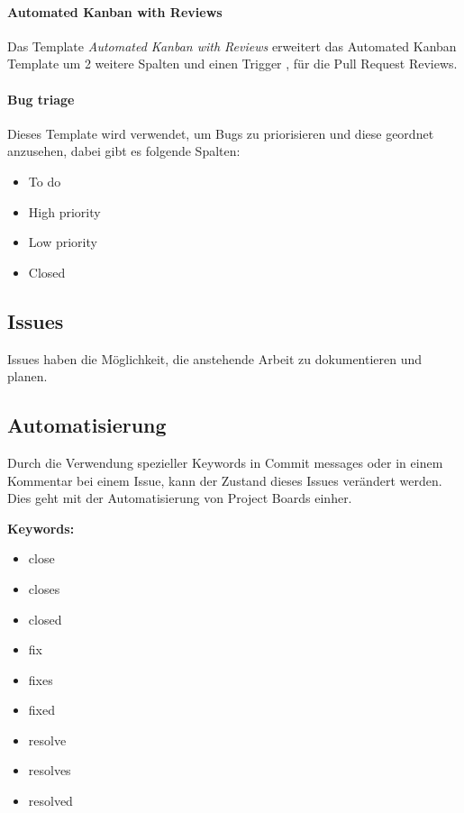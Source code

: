 \paragraph{Automated Kanban with Reviews}
Das Template \emph{Automated Kanban with Reviews} erweitert das Automated Kanban Template um 2 weitere Spalten und einen Trigger
, für die Pull Request Reviews.

\paragraph{Bug triage}
Dieses Template wird verwendet, um Bugs zu priorisieren und diese geordnet anzusehen, dabei gibt es folgende Spalten:

\begin{itemize}
    \item To do
    \item High priority
    \item Low priority
    \item Closed
\end{itemize}

\subsection{Issues}
Issues haben die Möglichkeit, die anstehende Arbeit zu dokumentieren und planen.

\cite{github-issues}

\subsection{Automatisierung}
Durch die Verwendung spezieller Keywords in Commit messages oder in einem Kommentar bei einem Issue, kann der Zustand dieses
Issues verändert werden.
Dies geht mit der Automatisierung von Project Boards einher.

\textbf{Keywords:}

\begin{itemize}
    \item close
    \item closes
    \item closed
    \item fix
    \item fixes
    \item fixed
    \item resolve
    \item resolves
    \item resolved
\end{itemize}


